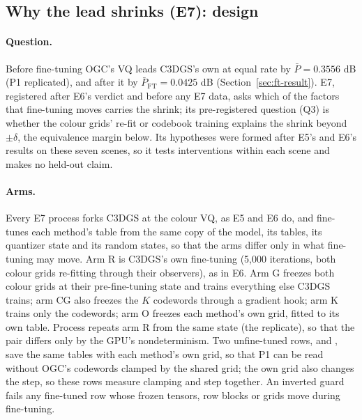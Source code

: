 \subsection{Why the lead shrinks (E7): design}
\label{sec:ft-why}

\paragraph{Question.}
Before fine-tuning OGC's VQ leads C3DGS's own at equal rate by $\bar P = 0.3556$ dB (P1 replicated), and after it by $\bar P_{\mathrm{FT}} = 0.0425$ dB (Section~\ref{sec:ft-result}). %
E7, registered after E6's verdict and before any E7 data, asks which of the factors that fine-tuning moves carries the shrink; its pre-registered question (Q3) is whether the colour grids' re-fit or codebook training explains the shrink beyond $\pm\delta$, the equivalence margin below. %
Its hypotheses were formed after E5's and E6's results on these seven scenes, so it tests interventions within each scene and makes no held-out claim. %

\paragraph{Arms.}
Every E7 process forks C3DGS at the colour VQ, as E5 and E6 do, and fine-tunes each method's table from the same copy of the model, its tables, its quantizer state and its random states, so that the arms differ only in what fine-tuning may move. %
Arm R is C3DGS's own fine-tuning (5,000 iterations, both colour grids re-fitting through their observers), as in E6. %
Arm G freezes both colour grids at their pre-fine-tuning state and trains everything else C3DGS trains; arm CG also freezes the $K$ codewords through a gradient hook; arm K trains only the codewords; arm O freezes each method's own grid, fitted to its own table. %
Process  repeats arm R from the same state (the replicate), so that the pair differs only by the GPU's nondeterminism. %
Two unfine-tuned rows,  and , save the same tables with each method's own grid, so that P1 can be read without OGC's codewords clamped by the shared grid; the own grid also changes the step, so these rows measure clamping and step together. %
An inverted guard fails any fine-tuned row whose frozen tensors, row blocks or grids move during fine-tuning. %

